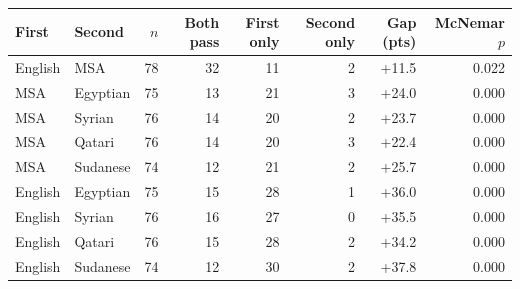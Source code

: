\begin{tabular}{llrrrrrr}
\toprule
First & Second & $n$ & Both pass & First only & Second only & Gap (pts) & McNemar $p$ \\
\midrule
English & MSA & 78 & 32 & 11 & 2 & +11.5 & 0.022 \\
MSA & Egyptian & 75 & 13 & 21 & 3 & +24.0 & 0.000 \\
MSA & Syrian & 76 & 14 & 20 & 2 & +23.7 & 0.000 \\
MSA & Qatari & 76 & 14 & 20 & 3 & +22.4 & 0.000 \\
MSA & Sudanese & 74 & 12 & 21 & 2 & +25.7 & 0.000 \\
English & Egyptian & 75 & 15 & 28 & 1 & +36.0 & 0.000 \\
English & Syrian & 76 & 16 & 27 & 0 & +35.5 & 0.000 \\
English & Qatari & 76 & 15 & 28 & 2 & +34.2 & 0.000 \\
English & Sudanese & 74 & 12 & 30 & 2 & +37.8 & 0.000 \\
\bottomrule
\end{tabular}

